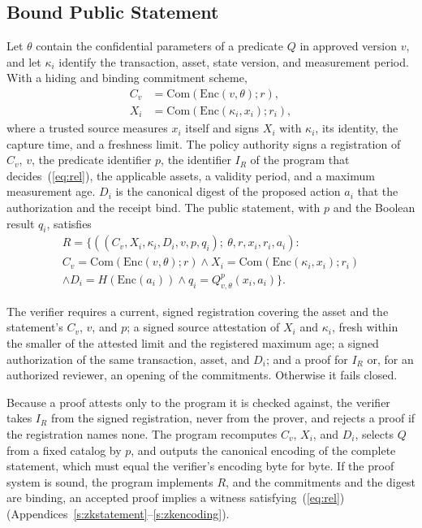\documentclass[journal]{IEEEtran}
\newcommand{\Com}{\mathrm{Com}}
\newcommand{\Enc}{\mathrm{Enc}}
\begin{document}
\subsection{Bound Public Statement}
Let $\theta$ contain the confidential parameters of a predicate $Q$ in approved version $v$, and let $\kappa_i$ identify the transaction, asset, state version, and measurement period. With a hiding and binding commitment scheme,
\begin{align}
C_v &= \Com(\Enc(v,\theta); r), \label{eq:cv}\\
X_i &= \Com(\Enc(\kappa_i, x_i); r_i), \label{eq:xi}
\end{align}
where a trusted source measures $x_i$ itself and signs $X_i$ with $\kappa_i$, its identity, the capture time, and a freshness limit. The policy authority signs a registration of $C_v$, $v$, the predicate identifier $p$, the identifier $I_R$ of the program that decides~(\ref{eq:rel}), the applicable assets, a validity period, and a maximum measurement age. $D_i$ is the canonical digest of the proposed action $a_i$ that the authorization and the receipt bind. The public statement, with $p$ and the Boolean result $q_i$, satisfies
\begin{multline}
\label{eq:rel}
R = \{ ((C_v, X_i, \kappa_i, D_i, v, p, q_i);\ \theta, r, x_i, r_i, a_i) : \\
C_v = \Com(\Enc(v,\theta); r) \wedge X_i = \Com(\Enc(\kappa_i,x_i); r_i) \\
\wedge D_i = H(\Enc(a_i)) \wedge q_i = Q^{p}_{v,\theta}(x_i, a_i) \}.
\end{multline}

The verifier requires a current, signed registration covering the asset and the statement's $C_v$, $v$, and $p$; a signed source attestation of $X_i$ and $\kappa_i$, fresh within the smaller of the attested limit and the registered maximum age; a signed authorization of the same transaction, asset, and $D_i$; and a proof for $I_R$ or, for an authorized reviewer, an opening of the commitments. Otherwise it fails closed.

Because a proof attests only to the program it is checked against, the verifier takes $I_R$ from the signed registration, never from the prover, and rejects a proof if the registration names none. The program recomputes $C_v$, $X_i$, and $D_i$, selects $Q$ from a fixed catalog by $p$, and outputs the canonical encoding of the complete statement, which must equal the verifier's encoding byte for byte. If the proof system is sound, the program implements $R$, and the commitments and the digest are binding, an accepted proof implies a witness satisfying~(\ref{eq:rel}) (Appendices~\ref{s:zkstatement}--\ref{s:zkencoding}).
\end{document}
